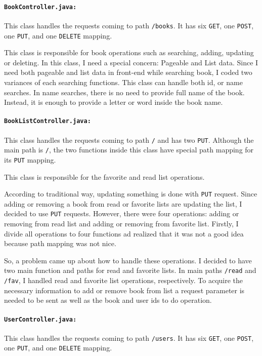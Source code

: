\paragraph{\texttt{BookController.java:}} This class handles the requests coming to path \texttt{/books}. It has six \texttt{GET}, one \texttt{POST}, one \texttt{PUT}, and one \texttt{DELETE} mapping. 

This class is responsible for book operations such as searching, adding, updating or deleting. In this class, I need a special concern: Pageable and List data. Since I need both pageable and list data in front-end while searching book, I coded two variances of each searching functions. This class can handle both id, or name searches. In name searches, there is no need to provide full name of the book. Instead, it is enough to provide a letter or word inside the book name.

\paragraph{\texttt{BookListController.java:}} This class handles the requests coming to path \texttt{/} and has two \texttt{PUT}. Although the main path is \texttt{/}, the two functions inside this class have special path mapping for its \texttt{PUT} mapping.

This class is responsible for the favorite and read list operations. 

According to traditional way, updating something is done with \texttt{PUT} request. Since adding or removing a book from read or favorite lists are updating the list, I decided to use \texttt{PUT} requests. However, there were four operations: adding or removing from read list and adding or removing from favorite list. Firstly, I divide all operations to four functions ad realized that it was not a good idea because path mapping was not nice. 

So, a problem came up about how to handle these operations. I decided to have two main function and paths for read and favorite lists. In main paths \texttt{/read} and \texttt{/fav}, I handled read and favorite list operations, respectively. To acquire the necessary information to add or remove book from list a request parameter is needed to be sent as well as the book and user ids to do operation.

\paragraph{\texttt{UserController.java:}} This class handles the requests coming to path \texttt{/users}. It has six \texttt{GET}, one \texttt{POST}, one \texttt{PUT}, and one \texttt{DELETE} mapping.

